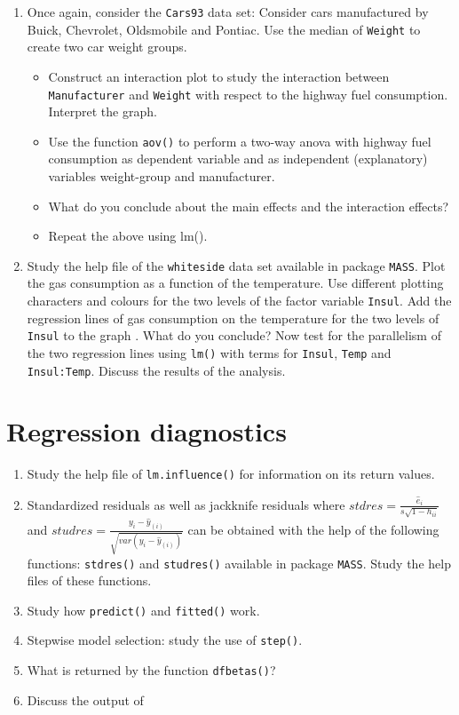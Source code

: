 \documentclass[
]{book}
\providecommand{\tightlist}{%
  \setlength{\itemsep}{0pt}\setlength{\parskip}{0pt}}
\begin{document}
\begin{enumerate}
\def\labelenumi{(\alph{enumi})}
\setcounter{enumi}{2}
\item
  Once again, consider the \texttt{Cars93} data set: Consider cars manufactured by Buick, Chevrolet, Oldsmobile and Pontiac. Use the median of \texttt{Weight} to create two car weight groups.

  \begin{itemize}
  \tightlist
  \item
    Construct an interaction plot to study the interaction between \texttt{Manufacturer} and \texttt{Weight} with respect to the highway fuel consumption. Interpret the graph.
  \item
    Use the function \texttt{aov()} to perform a two-way anova with highway fuel consumption as dependent variable and as independent (explanatory) variables weight-group and manufacturer.
  \item
    What do you conclude about the main effects and the interaction effects?
  \item
    Repeat the above using lm().
  \end{itemize}
\item
  Study the help file of the \texttt{whiteside} data set available in package \texttt{MASS}. Plot the gas consumption as a function of the temperature. Use different plotting characters and colours for the two levels of the factor variable \texttt{Insul}. Add the regression lines of gas consumption on the temperature for the two levels of \texttt{Insul} to the graph . What do you conclude? Now test for the parallelism of the two regression lines using \texttt{lm()} with terms for \texttt{Insul}, \texttt{Temp} and \texttt{Insul:Temp}. Discuss the results of the analysis.
\end{enumerate}

\section{Regression diagnostics}\label{regression-diagnostics}

\begin{enumerate}
\def\labelenumi{(\alph{enumi})}
\item
  Study the help file of \texttt{lm.influence()} for information on its return values.
\item
  Standardized residuals as well as jackknife residuals where \(stdres = \frac{\hat{e}_i}{s\sqrt{1-h_{ii}}}\) and \(studres = \frac{y_i-\hat{y}_{(i)}}{\sqrt{var(y_i-\hat{y}_{(i)})}}\) can be obtained with the help of the following functions: \texttt{stdres()} and \texttt{studres()} available in package \texttt{MASS}. Study the help files of these functions.
\item
  Study how \texttt{predict()} and \texttt{fitted()} work.
\item
  Stepwise model selection: study the use of \texttt{step()}.
\item
  What is returned by the function \texttt{dfbetas()}?
\item
  Discuss the output of
\end{enumerate}
\end{document}
